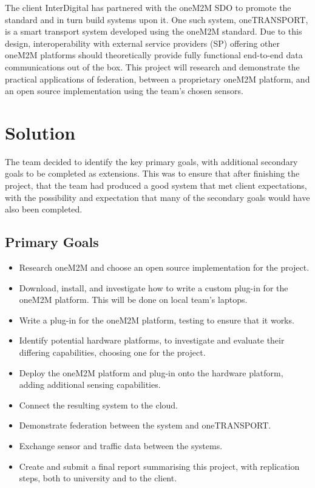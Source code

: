 The client InterDigital has partnered with the oneM2M SDO to promote the standard and in turn build systems upon it. One such system, oneTRANSPORT, is a smart transport system \cite{InterDigital2016OneTRANSPORT:Today} developed using the oneM2M standard. Due to this design, interoperability with external service providers (SP) offering other oneM2M platforms should theoretically provide fully functional end-to-end data communications out of the box. This project will research and demonstrate the practical applications of federation, between a proprietary oneM2M platform, and an open source implementation using the team's chosen sensors.    

\section{Solution}

The team decided to identify the key primary goals, with additional secondary goals to be completed as extensions. This was to ensure that after finishing the project, that the team had produced a good system that met client expectations, with the possibility and expectation that many of the secondary goals would have also been completed.

\subsection{Primary Goals}

\begin{itemize}
  \item Research oneM2M and choose an open source implementation for the project.
  \item Download, install, and investigate how to write a custom plug-in for the oneM2M platform. This will be done on local team's laptops.
  \item Write a plug-in for the oneM2M platform, testing to ensure that it works.
  \item Identify potential hardware platforms, to investigate and evaluate their differing capabilities, choosing one for the project. 
  \item Deploy the oneM2M platform and plug-in onto the hardware platform, adding additional sensing capabilities.
  \item Connect the resulting system to the cloud.
  \item Demonstrate federation between the system and oneTRANSPORT.
  \item Exchange sensor and traffic data between the systems.
  \item Create and submit a final report summarising this project, with replication steps, both to university and to the client.
\end{itemize}

